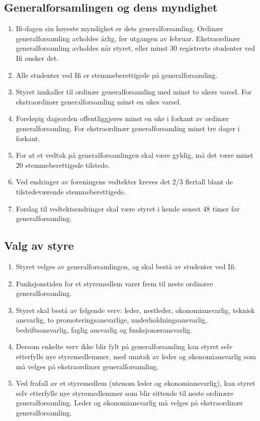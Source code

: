 \documentclass[norsk,a4paper]{article}
\begin{document}
\subsection{Generalforsamlingen og dens myndighet}
\begin{enumerate}
    \item{Ifi-dagen sin høyeste myndighet er dets generalforsamling. Ordinær generalforsamling avholdes årlig, før utgangen av februar. Ekstraordinær generalforsamling avholdes når styret, eller minst 30 registrerte studenter ved Ifi ønsker det.}
    \item{Alle studenter ved Ifi er stemmeberettigede på generalforsamling.}
    \item{Styret innkaller til ordinær generalforsamling med minst to ukers varsel. For ekstraordinær generalforsamling minst en ukes varsel.}
    \item{Foreløpig dagsorden offentliggjøres minst en uke i forkant av ordinær generalforsamling. For ekstraordinær generalforsamling minst tre dager i forkant.}
    \item{For at et vedtak på generalforsamlingen skal være gyldig, må det være minst 20 stemmeberettigede tilstede.}
    \item{Ved endringer av foreningens vedtekter kreves det 2/3 flertall blant de tilstedeværende stemmeberettigede.}
    \item{Forslag til vedtektsendringer skal være styret i hende senest 48 timer før generalforsamling.}
\end{enumerate}
\subsection{Valg av styre}
\begin{enumerate}
    \item Styret velges av generalforsamlingen, og skal bestå av studenter ved Ifi.
    \item Funksjonstiden for et styremedlem varer frem til neste ordinære generalforsamling.
	\item Styret skal bestå av følgende verv: leder, nestleder, økonomiansvarlig, teknisk ansvarlig, to promoteringsansvarlige, underholdningsansvarlig, bedriftsansvarlig, faglig ansvarlig og funksjonæransvarlig.
    \item Dersom enkelte verv ikke blir fylt på generalforsamling kan styret selv etterfylle nye styremedlemmer, med unntak av leder og økonomiansvarlig som må velges på ekstraordinær generalforsamling.
    \item Ved frafall av et styremedlem (utenom leder og økonomiansvarlig), kan styret selv etterfylle nye styremedlemmer som blir sittende til neste ordinære generalforsamling. Leder og økonomiansvarlig må velges på ekstraordinær generalforsamling. 
\end{enumerate}
\end{document}
